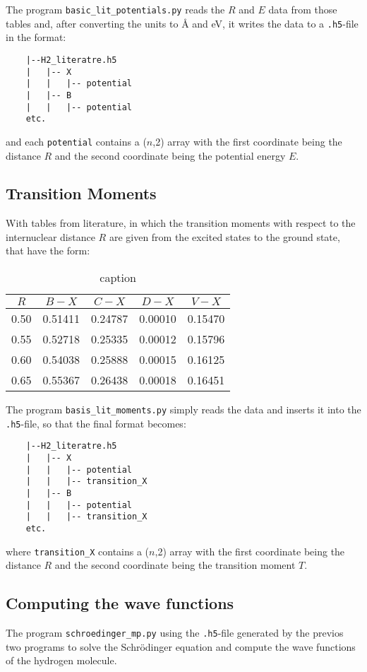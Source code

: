 The program \texttt{basic\_lit\_potentials.py} reads the $R$ and  $E$ data from those tables and, after converting the units to \si{\angstrom} and \si{\eV}, it writes the data to a \texttt{.h5}-file in the format:

\begin{verbatim}
    |--H2_literatre.h5
    |   |-- X
    |   |   |-- potential
    |   |-- B
    |   |   |-- potential
    etc.
\end{verbatim}
and each \texttt{potential} contains a ($n$,2) array with the first coordinate being the distance $R$ and the second coordinate being the potential energy $E$.

\subsection{Transition Moments}
With tables from literature, in which the transition moments with respect to the internuclear distance $R$ are given from the excited states to the ground state, that have the form:
\begin{table}[htpb]
    \centering
    \caption{caption}
    \label{tab:label}
    \begin{tabular}{c|c|c|c|c}
        $R$    &     $B - X$    &   $C - X$    &   $D - X$  &   $V - X$    \\ 
        \hline
        0.50 & 0.51411 & 0.24787 & 0.00010 & 0.15470\\
        0.55 & 0.52718 & 0.25335 & 0.00012 & 0.15796 \\
        0.60 & 0.54038 & 0.25888 & 0.00015 & 0.16125 \\
        0.65 & 0.55367 & 0.26438 & 0.00018 & 0.16451 \\
    \end{tabular}
\end{table}
The program \texttt{basis\_lit\_moments.py} simply reads the data and inserts it into the \texttt{.h5}-file, so that the final format becomes:
\begin{verbatim}
    |--H2_literatre.h5
    |   |-- X
    |   |   |-- potential
    |   |   |-- transition_X
    |   |-- B
    |   |   |-- potential
    |   |   |-- transition_X
    etc.
\end{verbatim}

where \texttt{transition\_X} contains a ($n$,2) array with the first coordinate being the distance $R$ and the second coordinate being the transition moment $T$.

\subsection{Computing the wave functions}
The program \texttt{schroedinger\_mp.py} using the \texttt{.h5}-file generated by the previos two programs to solve the Schrödinger equation and compute the wave functions of the hydrogen molecule.


